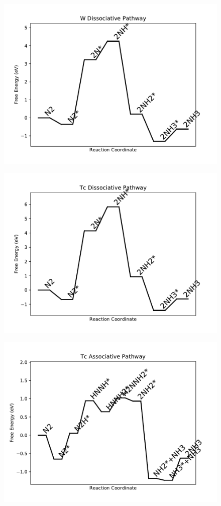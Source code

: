 \begin{figure}
\includegraphics[width=0.8\linewidth]{data/plots/W_dissociative.pdf}
\end{figure}

\begin{figure}
\includegraphics[width=0.8\linewidth]{data/plots/Tc_dissociative.pdf}
\end{figure}

\begin{figure}
\includegraphics[width=0.8\linewidth]{data/plots/Tc_associative.pdf}
\end{figure}

